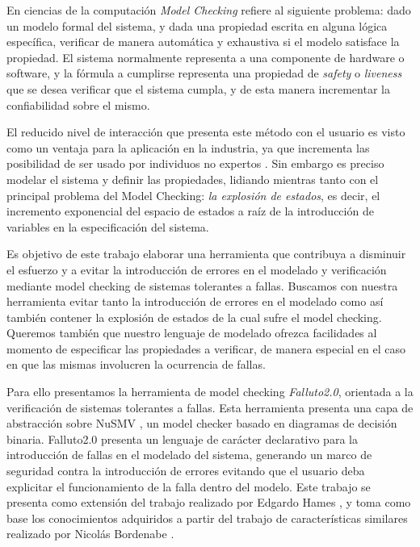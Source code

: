 \documentclass[pdftex,a4paper,12pt]{book}
\begin{document}
En ciencias de la computaci\'on \emph{Model Checking} refiere al siguiente problema: dado un modelo formal del sistema, y dada una propiedad escrita en alguna l\'ogica espec\'ifica, verificar de manera autom\'atica y exhaustiva si el modelo satisface la propiedad. El sistema normalmente representa a una componente de hardware o software, y la f\'ormula a cumplirse representa una propiedad de \emph{safety} o \emph{liveness} que se desea verificar que el sistema cumpla, y de esta manera incrementar la confiabilidad sobre el mismo.

El reducido nivel de interacci\'on que presenta este m\'etodo con el usuario es visto como un ventaja para la aplicaci\'on en la industria, ya que incrementa las posibilidad de ser usado por individuos no expertos \cite{RuysBrinksma}.
Sin embargo es preciso modelar el sistema y definir las propiedades, lidiando mientras tanto con el principal problema del Model Checking: \emph{la explosi\'on de estados}, es decir, el incremento exponencial del espacio de estados a ra\'iz de la introducci\'on de variables en la especificaci\'on del sistema.


Es objetivo de este trabajo elaborar una herramienta que contribuya a disminuir el esfuerzo y a evitar la introducci\'on de errores en el modelado y verificaci\'on mediante model checking de sistemas tolerantes a fallas. Buscamos con nuestra herramienta evitar tanto la introducci\'on de errores en el modelado como as\'i tambi\'en contener la explosi\'on de estados de la cual sufre el model checking. Queremos tambi\'en que nuestro lenguaje de modelado ofrezca facilidades al momento de especificar las propiedades a verificar, de manera especial en el caso en que las mismas involucren la ocurrencia de fallas.

Para ello presentamos la herramienta de model checking \emph{Falluto2.0}, o\-rien\-ta\-da a la verificaci\'on de sistemas tolerantes a fallas. Esta herramienta presenta una capa de abstracci\'on sobre NuSMV \cite{NuSMV}, un model checker basado en diagramas de decisi\'on binaria. Falluto2.0 presenta un lenguaje de car\'acter declarativo para la introducci\'on de fallas en el modelado del sistema, generando un marco de seguridad contra la introducci\'on de errores evitando que el usuario deba explicitar el funcionamiento de la falla dentro del modelo. Este trabajo se presenta como extensi\'on del trabajo realizado por Edgardo Hames \cite{Hames}, y toma como base los conocimientos adquiridos a partir del trabajo de caracter\'isticas similares realizado por Nicol\'as Bordenabe \cite{Bordenabe}.
\end{document}
